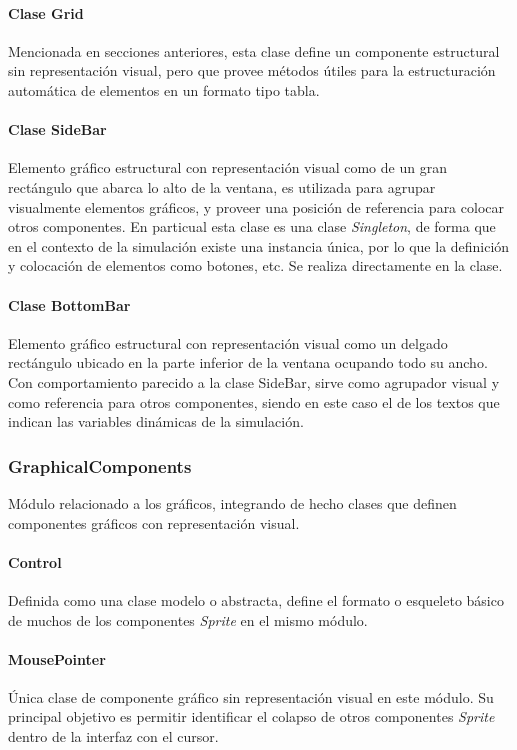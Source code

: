 \documentclass[]{article}
\begin{document}
			\paragraph{Clase Grid}
			Mencionada en secciones anteriores, esta clase define un componente estructural sin representación visual, pero que provee métodos útiles para la estructuración automática de elementos en un formato tipo tabla.
			
			\paragraph{Clase SideBar}
			Elemento gráfico estructural con representación visual como de un gran rectángulo que abarca lo alto de la ventana, es utilizada para agrupar visualmente elementos gráficos, y proveer una posición de referencia para colocar otros componentes. En particual esta clase es una clase \textit{Singleton}, de forma que en el contexto de la simulación existe una instancia única, por lo que la definición y colocación de elementos como botones, etc. Se realiza directamente en la clase.
			
			\paragraph{Clase BottomBar}
			Elemento gráfico estructural con representación visual como un delgado rectángulo ubicado en la parte inferior de la ventana ocupando todo su ancho. Con comportamiento parecido a la clase SideBar, sirve como agrupador visual y como referencia para otros componentes, siendo en este caso el de los textos que indican las variables dinámicas de la simulación.
		
		
		
		\subsubsection{GraphicalComponents}
			Módulo relacionado a los gráficos, integrando de hecho clases que definen componentes gráficos con representación visual.
			
			\paragraph{Control}
			Definida como una clase modelo o abstracta, define el formato o esqueleto básico de muchos de los componentes \textit{Sprite} en el mismo módulo.
			
			\paragraph{MousePointer}
			Única clase de componente gráfico sin representación visual en este módulo. Su principal objetivo es permitir identificar el colapso de otros componentes \textit{Sprite} dentro de la interfaz con el cursor.
			
\end{document}

